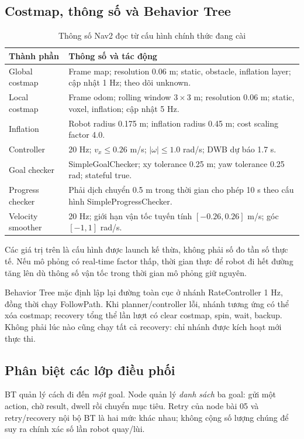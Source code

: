 \subsection{Costmap, thông số và Behavior Tree}
\begin{table}[H]\centering\small
\caption{Thông số Nav2 đọc từ cấu hình chính thức đang cài}\label{tab:navparams}
\begin{tabularx}{\linewidth}{@{}P{5.2cm}Y@{}}\toprule
Thành phần&Thông số và tác động\\\midrule
Global costmap&Frame map; resolution 0.06 m; static, obstacle, inflation layer; cập nhật 1 Hz; theo dõi unknown.\\
Local costmap&Frame odom; rolling window $3\times3$ m; resolution 0.06 m; static, voxel, inflation; cập nhật 5 Hz.\\
Inflation&Robot radius 0.175 m; inflation radius 0.45 m; cost scaling factor 4.0.\\
Controller&20 Hz; $v_x\le0.26$ m/s; $|\omega|\le1.0$ rad/s; DWB dự báo 1.7 s.\\
Goal checker&SimpleGoalChecker; xy tolerance 0.25 m; yaw tolerance 0.25 rad; stateful true.\\
Progress checker&Phải dịch chuyển 0.5 m trong thời gian cho phép 10 s theo cấu hình SimpleProgressChecker.\\
Velocity smoother&20 Hz; giới hạn vận tốc tuyến tính $[-0.26,0.26]$ m/s; góc $[-1,1]$ rad/s.\\\bottomrule
\end{tabularx}\end{table}
Các giá trị trên là cấu hình được launch kế thừa, không phải số đo tần số thực tế. Nếu mô phỏng có real-time factor thấp, thời gian thực để robot đi hết đường tăng lên dù thông số vận tốc trong thời gian mô phỏng giữ nguyên.

Behavior Tree mặc định  lập lại đường toàn cục ở nhánh RateController 1 Hz, đồng thời chạy FollowPath. Khi planner/controller lỗi, nhánh tương ứng có thể xóa costmap; recovery tổng thể lần lượt có clear costmap, spin, wait, backup. Không phải lúc nào cũng chạy tất cả recovery: chỉ nhánh được kích hoạt mới thực thi.

\subsection{Phân biệt các lớp điều phối}
BT quản lý cách đi đến \emph{một} goal. Node  quản lý \emph{danh sách} ba goal: gửi một action, chờ result, dwell rồi chuyển mục tiêu. Retry của node bài 05 và retry/recovery nội bộ BT là hai mức khác nhau; không cộng số lượng chúng để suy ra chính xác số lần robot quay/lùi.

